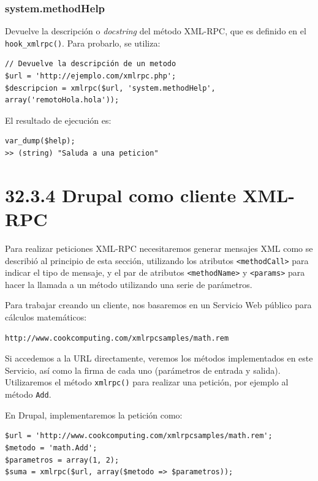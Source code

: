 \subsubsection{\large{system.methodHelp}}

Devuelve la descripción o \textit{docstring} del método XML-RPC, que es definido en el \verb|hook_xmlrpc()|. 
Para probarlo, se utiliza:

\begin{verbatim}
// Devuelve la descripción de un metodo
$url = 'http://ejemplo.com/xmlrpc.php';
$descripcion = xmlrpc($url, 'system.methodHelp', array('remotoHola.hola'));
\end{verbatim} 

El resultado de ejecución es:

\begin{verbatim}
var_dump($help);
>> (string) "Saluda a una peticion"
\end{verbatim}

\section{\Large{32.3.4 Drupal como cliente XML-RPC}}

Para realizar peticiones XML-RPC necesitaremos generar mensajes XML como se describió al principio de esta sección, 
utilizando los atributos \verb|<methodCall>| para indicar el tipo de mensaje, y el par de atributos \verb|<methodName>| 
y \verb|<params>| para hacer la llamada a un método utilizando una serie de parámetros.

Para trabajar creando un cliente, nos basaremos en un Servicio Web público para cálculos matemáticos:

\begin{verbatim}
http://www.cookcomputing.com/xmlrpcsamples/math.rem
\end{verbatim}

Si accedemos a la URL directamente, veremos los métodos implementados en este Servicio, así como la firma 
de cada uno (parámetros de entrada y salida). Utilizaremos el método \verb|xmlrpc()| para realizar una 
petición, por ejemplo al método \verb|Add|.

En Drupal, implementaremos la petición como:
 
\begin{verbatim}
$url = 'http://www.cookcomputing.com/xmlrpcsamples/math.rem';
$metodo = 'math.Add';
$parametros = array(1, 2);
$suma = xmlrpc($url, array($metodo => $parametros));
\end{verbatim}


